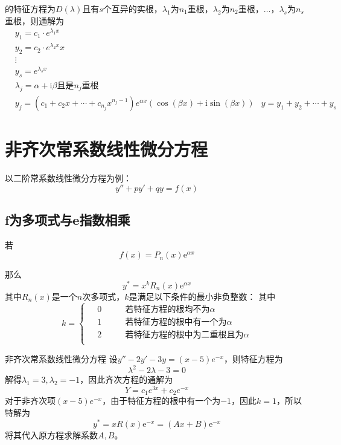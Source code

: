 \documentclass[math]{amznotes}
\begin{document}
的特征方程为$D(\lambda)$且有$s$个互异的实根，$\lambda_1$为$n_1$重根，$\lambda_2$为$n_2$重根，$\ldots$，$\lambda_s$为$n_s$重根，则通解为
\begin{equation*}
  \begin{aligned}
    &y_1 = c_1 \cdot e^{\lambda_1 x}\\
    &y_2 = c_2 \cdot e^{\lambda_2 x}x\\
    &\vdots\\
    &y_{s} = e^{\lambda_s x}\\
    &\lambda_j = \alpha + \mathrm{i}\beta \text{且是}n_j\text{重根}\\
    &y_j = (c_1 + c_2 x + \cdots + c_{n_j} x^{n_j - 1}) e^{\alpha x}(\cos(\beta x) + \mathrm{i} \sin(\beta x))
    &y = y_1 + y_2 + \cdots + y_s
  \end{aligned}
\end{equation*}
\section{非齐次常系数线性微分方程}
以二阶常系数线性微分方程为例：
\begin{equation*}
    y'' + py' + qy = f(x)
\end{equation*}
\subsection{f为多项式与e指数相乘}
若$$f(x) = P_n(x)\mathrm{e}^{\alpha x}$$

那么
\begin{equation*}
    y^* = x^k R_n(x)\mathrm{e}^{\alpha x}
\end{equation*}
其中$R_n(x)$是一个$n$次多项式，$k$是满足以下条件的最小非负整数：
其中\begin{equation*}
  k = \left\{
    \begin{aligned}
      \;&0 \qquad&\text{若特征方程的根均不为}\alpha\\
      &1 \qquad&\text{若特征方程的根中有一个为}\alpha\\
      &2 \qquad&\text{若特征方程的根中为二重根且为}\alpha\\
    \end{aligned}
  \right.
\end{equation*}
\begin{exbox}{非齐次常系数线性微分方程}{}
    设$y'' - 2y' - 3y = (x - 5)e^{-x}$，则特征方程为
    \begin{equation*}
        \lambda^2 - 2\lambda - 3 = 0
    \end{equation*}
    解得$\lambda_1 = 3, \lambda_2 = -1$，因此齐次方程的通解为
    \begin{equation*}
        Y = c_1 e^{3x} + c_2 e^{-x}
    \end{equation*}
    对于非齐次项$(x - 5)e^{-x}$，由于特征方程的根中有一个为$-1$，因此$k = 1$，所以特解为
    \begin{equation*}
        y^* = x R(x) \mathrm{e}^{-x} = (Ax + B) \mathrm{e}^{-x}
    \end{equation*}
    将其代入原方程求解系数$A, B$。
\end{exbox}
\end{document}
